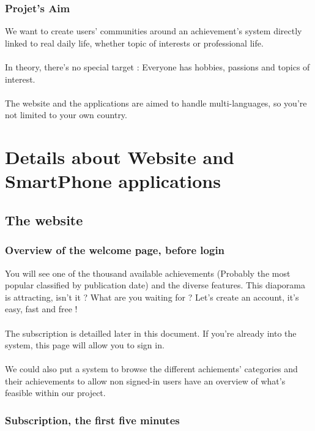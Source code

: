 \documentclass{life-en}
\begin{document}
\newpage

\subsection{Projet's Aim}

We want to create users' communities around an achievement's system directly linked to real daily life, whether topic of interests or professional life.\\
\\
In theory, there's no special target : Everyone has hobbies, passions and topics of interest.\\
\\
The website and the applications are aimed to handle multi-languages, so you're not limited to your own country.


\chapter{Details about Website and SmartPhone applications}

\section{The website}

\subsection{Overview of the welcome page, before login}

You will see one of the thousand available achievements (Probably the most popular classified by publication date) and the diverse features. This diaporama is attracting, isn't it ? What are you waiting for ? Let's create an account, it's easy, fast and free !\\
\\
The subscription is detailled later in this document.
If you're already into the system, this page will allow you to sign in.\\
\\
We could also put a system to browse the different achiements' categories and their achievements to allow non signed-in users have an overview of what's feasible within our project.

\newpage

\subsection{Subscription, the first five minutes}
\end{document}
